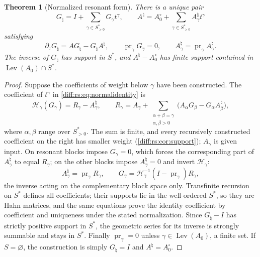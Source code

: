 \documentclass[11pt,letterpaper]{article}
\numberwithin{equation}{section}
\newtheorem{theorem}{Theorem}[section]
\theoremstyle{definition}
\theoremstyle{remark}
\newcommand{\der}{\partial}
\newcommand{\derT}{\der_{\tau}}
\newcommand{\Lev}{\operatorname{Lev}}
\newcommand{\pr}{\operatorname{pr}}
\begin{document}
\begin{theorem}[Normalized resonant form]
\label{diff:rs:thm:normal}
There is a unique pair
\begin{equation}\label{diff:rs:eq:GA}
 G_{\natural}=I+\sum_{\gamma\in S^{*}_{>0}}G_{\gamma}t^{\gamma},
 \qquad
 A^{\natural}=A_{0}^{\circ}+\sum_{\gamma\in S^{*}_{>0}}A^{\natural}_{\gamma}t^{\gamma}
\end{equation}
satisfying
\begin{equation}\label{diff:rs:eq:normalidentity}
 \derT G_{\natural}=AG_{\natural}-G_{\natural}A^{\natural},
 \qquad
 \pr_{\gamma}G_{\gamma}=0,
 \qquad
 A^{\natural}_{\gamma}=\pr_{\gamma}A^{\natural}_{\gamma}.
\end{equation}
The inverse of $G_{\natural}$ has support in $S^{*}$, and
$A^{\natural}-A_{0}^{\circ}$ has finite support contained in
$\Lev(A_{0})\cap S^{*}$.
\end{theorem}
\begin{proof}
Suppose the coefficients of weight below $\gamma$ have been constructed. The
coefficient of $t^{\gamma}$ in \cref{diff:rs:eq:normalidentity} is
\begin{equation}\label{diff:rs:eq:recursion}
 \mathcal H_{\gamma}(G_{\gamma})=R_{\gamma}-A^{\natural}_{\gamma},
 \qquad
 R_{\gamma}=A_{\gamma}+\sum_{\substack{\alpha+\beta=\gamma\\ \alpha,\beta>0}}
 \bigl(A_{\alpha}G_{\beta}-G_{\alpha}A^{\natural}_{\beta}\bigr),
\end{equation}
where $\alpha,\beta$ range over $S^{*}_{>0}$. The sum is finite,
and every recursively constructed coefficient on the right has smaller
weight (\cref{diff:rs:cor:support}); $A_{\gamma}$ is given input. On resonant blocks impose $G_{\gamma}=0$, which
forces the corresponding part of $A^{\natural}_{\gamma}$ to equal $R_{\gamma}$;
on the other blocks impose $A^{\natural}_{\gamma}=0$ and invert
$\mathcal H_{\gamma}$:
\begin{equation}\label{diff:rs:eq:explicit}
 \boxed{\quad
 A^{\natural}_{\gamma}=\pr_{\gamma}R_{\gamma},
 \qquad
 G_{\gamma}=\mathcal H_{\gamma}^{-1}(I-\pr_{\gamma})R_{\gamma},
 \quad}
\end{equation}
the inverse acting on the complementary block space only. Transfinite
recursion on $S^{*}$ defines all coefficients; their supports lie in the
well-ordered $S^{*}$, so they are Hahn matrices, and the same equations prove
the identity coefficient by coefficient and uniqueness under the stated
normalization. Since $G_{\natural}-I$ has strictly positive support in $S^{*}$,
the geometric series for its inverse is strongly summable and stays in $S^{*}$.
Finally $\pr_{\gamma}=0$ unless $\gamma\in\Lev(A_{0})$, a finite set.
If $S=\varnothing$, the construction is simply
$G_{\natural}=I$ and $A^{\natural}=A_{0}^{\circ}$.
\end{proof}
\end{document}
